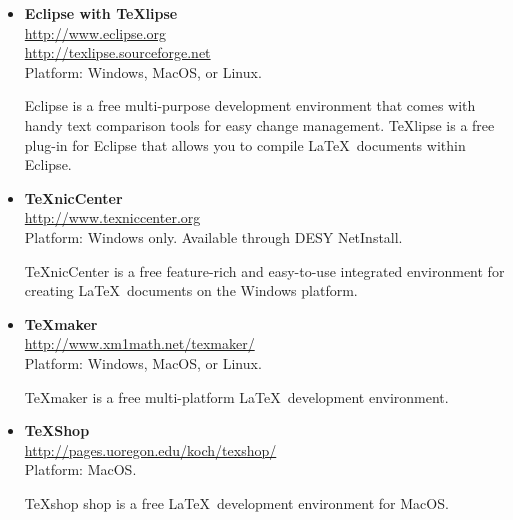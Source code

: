 \documentclass[]{xfel.eu-report}
\begin{document}
\begin{itemize}
\item {\bf  Eclipse with \TeX lipse}\nopagebreak\\     
\url{http://www.eclipse.org}\nopagebreak\\
\url{http://texlipse.sourceforge.net}\nopagebreak\\
Platform: Windows, MacOS, or Linux.

Eclipse is a free multi-purpose development environment that comes with handy text comparison tools for easy change management.  
\TeX lipse is a free plug-in for Eclipse that allows you to compile \LaTeX\ documents within Eclipse. 
\linebreak

\item {\bf \TeX nicCenter}\nopagebreak\\  
\url{http://www.texniccenter.org}\nopagebreak\\
Platform: Windows only. Available through DESY NetInstall.    

\TeX nicCenter is a free feature-rich and easy-to-use integrated environment for creating \LaTeX\ documents on the Windows platform.
\linebreak

\item {\bf \TeX maker}\nopagebreak\\     
\url{http://www.xm1math.net/texmaker/}\nopagebreak\\
Platform: Windows, MacOS, or Linux.

\TeX maker is a free multi-platform \LaTeX\ development environment. 
\linebreak

\item {\bf \TeX Shop}\nopagebreak\\   
\url{http://pages.uoregon.edu/koch/texshop/}\nopagebreak\\
Platform: MacOS.

\TeX shop shop is a free \LaTeX\ development environment for MacOS.  

\end{itemize}
\end{document}
